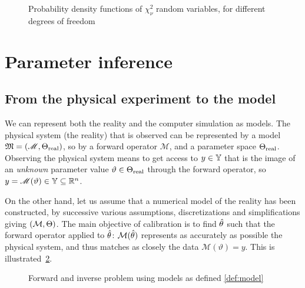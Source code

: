 \documentclass[../../Main_ManuscritThese.tex]{subfiles}
\newcommand\imgpath{/home/victor/acadwriting/Manuscrit/Text/Chapter2/img/}
\begin{document}
\begin{figure}[ht]
  \centering
  
  \caption[Probability density functions of $\chi^2$ r.v.]{Probability density functions of $\chi^2_{\nu}$ random variables, for different degrees of freedom}
  \label{fig:chi2_examples}
\end{figure}

\clearpage

\section{Parameter inference}
\label{sec:parameter_inference}
\subsection{From the physical experiment to the model}
\label{ssec:inv_problem}
We can represent both the reality and the computer simulation as
models.  The physical system (the reality) that is observed can be
represented by a model
$\mathfrak{M}=\left(\mathscr{M},\Theta_{\mathrm{real}}\right)$, so by
a forward operator $\mathscr{M}$, and a parameter space
$\Theta_{\mathrm{real}}$.  Observing the physical system means to get
access to $y\in \mathbb{Y}$ that is the image of an \emph{unknown}
parameter value $\vartheta \in \Theta_{\mathrm{real}}$ through the
forward operator, so
$y = \mathscr{M}(\vartheta)\in \mathbb{Y} \subseteq \mathbb{R}^n$.

On the other hand, let us assume that a numerical model of the reality
has been constructed, by successive various assumptions,
discretizations and simplifications giving $(\mathcal{M},\Theta)$. The
main objective of calibration is to find $\hat{\theta}$ such that the
forward operator applied to $\hat{\theta}$:
$\mathcal{M}(\hat{\theta})$ represents as accurately as possible the
physical system, and thus matches as closely the data
$\mathscr{M}(\vartheta)=y$. This is
illustrated~\cref{fig:inv_problem}.

\begin{figure}[ht]
  \centering
  
  \caption{Forward and inverse problem using models as defined \cref{def:model}}
  \label{fig:inv_problem}
\end{figure}

% 
\end{document}
